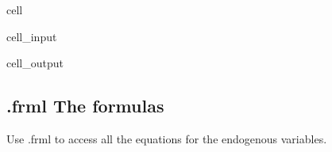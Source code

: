 \documentclass[letterpaper,10pt,english]{jupyterBook}
\begin{document}
\begin{sphinxuseclass}{cell}\begin{sphinxVerbatimInput}

\begin{sphinxuseclass}{cell_input}
\begin{sphinxVerbatim}[commandchars=\\\{\}]
\PYG{p}{[}\PYG{p}{]}
\end{sphinxVerbatim}

\end{sphinxuseclass}\end{sphinxVerbatimInput}
\begin{sphinxVerbatimOutput}

\begin{sphinxuseclass}{cell_output}
\begin{sphinxVerbatim}
\end{sphinxVerbatim}

\end{sphinxuseclass}\end{sphinxVerbatimOutput}

\end{sphinxuseclass}

\subsection{.frml The formulas}
\label{\detokenize{content/Python/modelflow_features:frml-the-formulas}}
\sphinxAtStartPar
Use .frml to access all the equations for the endogenous variables.
\end{document}
